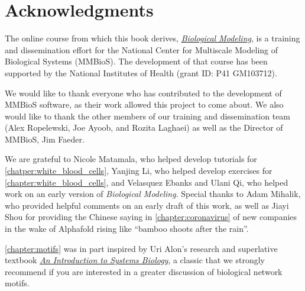 {\begin{tabular}[]{l @{\hskip 0.05\textwidth} l}
\end{tabular}
}

\newpage


 
\clearpage
{}
\chapter{Acknowledgments}
\label{chapter:acknowledgments}

The online course from which this book derives, \href{https://biologicalmodeling.org}{\textit{Biological Modeling}}, is a training and dissemination effort for the National Center for Multiscale Modeling of Biological Systems (MMBioS). The development of that course has been supported by the National Institutes of Health (grant ID: P41 GM103712).

We would like to thank everyone who has contributed to the development of MMBioS software, as their work allowed this project to come about. We also would like to thank the other members of our training and dissemination team (Alex Ropelewski, Joe Ayoob, and Rozita Laghaei) as well as the Director of MMBioS, Jim Faeder.

We are grateful to Nicole Matamala, who helped develop tutorials for \autoref{chatper:white_blood_cells}, Yanjing Li, who helped develop exercises for \autoref{chapter:white_blood_cells}, and Velasquez Ebanks and Ulani Qi, who helped work on an early version of \textit{Biological Modeling}. Special thanks to Adam Mihalik, who provided helpful comments on an early draft of this work, as well as Jiayi Shou for providing the Chinese saying in \autoref{chapter:coronavirus} of new companies in the wake of Alphafold rising like ``bamboo shoots after the rain''.

\autoref{chapter:motifs} was in part inspired by Uri Alon’s research and superlative textbook \href{https://www.weizmann.ac.il/mcb/UriAlon/introduction-systems-biology-design-principles-biological-circuits}{\textit{An Introduction to Systems Biology}}, a classic that we strongly recommend if you are interested in a greater discussion of biological network motifs.


